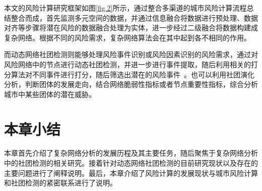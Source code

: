 本文的风险计算研究框架如图\ref{fig.2}所示，通过整合多渠道的城市风险计算流程总结整合而成，首先监测多元空间的数据，并通过信息融合将数据进行预处理、数据对齐等步骤将潜在风险的数据融合处理为实体，进一步经过二级融合将数据构建成复杂网络。根据不同的风险需求，复杂网络算法会在其中起到各不相同的作用。

而动态网络社团检测则能够处理风险事件识别或风险因素识别的风险需求，通过对风险网络中的节点进行动态社团检测，并进一步进行事件提取，随后利用相关的打分算法对不同事件进行打分，随后筛选出潜在的风险事件~\cite{moriano2019community-based}。也可以利用社团演化分析，判断团体的发展走向，结合网络脆弱性指标或者节点重要性指标，综合分析城市中某些团体的潜在威胁。



\section{本章小结}
本章首先介绍了复杂网络分析的发展历程及其主要任务，随后聚焦于复杂网络分析中的社团检测的相关研究。接着针对动态网络社团检测的目前研究现状以及存在的主要问题进行了阐释说明。最后，本章介绍了风险计算的发展现状与城市风险计算和社团检测的紧密联系进行了说明。
